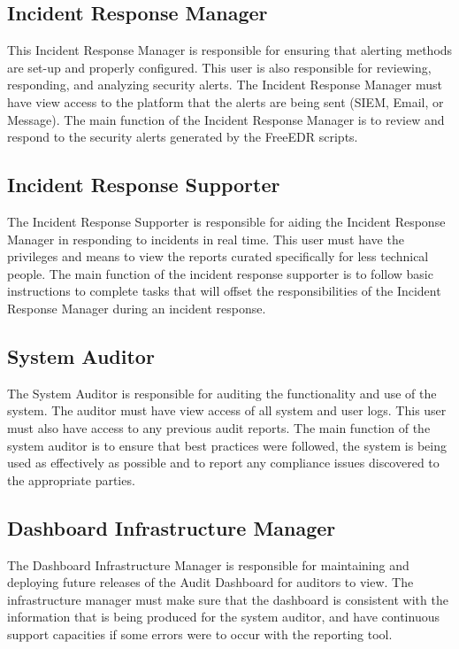 \documentclass{scrreprt}
\begin{document}
\subsection{Incident Response Manager}

This Incident Response Manager is responsible for ensuring that alerting methods are set-up and properly configured. This user is also responsible for reviewing, responding, and analyzing security alerts. The Incident Response Manager must have view access to the platform that the alerts are being sent (SIEM, Email, or Message). The main function of the Incident Response Manager is to review and respond to the security alerts generated by the FreeEDR scripts.


\subsection{Incident Response Supporter}

The Incident Response Supporter is responsible for aiding the Incident Response Manager in responding to incidents in real time. This user must have the privileges and means to view the reports curated specifically for less technical people. The main function of the incident response supporter is to follow basic instructions to complete tasks that will offset the responsibilities of the Incident Response Manager during an incident response. 

\subsection{System Auditor}

The System Auditor is responsible for auditing the functionality and use of the system. The auditor must have view access of all system and user logs. This user must also have access to any previous audit reports. The main function of the system auditor is to ensure that best practices were followed, the system is being used as effectively as possible and to report any compliance issues discovered to the appropriate parties.

\subsection{Dashboard Infrastructure Manager}

The Dashboard Infrastructure Manager is responsible for maintaining and deploying future releases of the Audit Dashboard for auditors to view. The infrastructure manager must make sure that the dashboard is consistent with the information that is being produced for the system auditor, and have continuous support capacities if some errors were to occur with the reporting tool.
\end{document}
